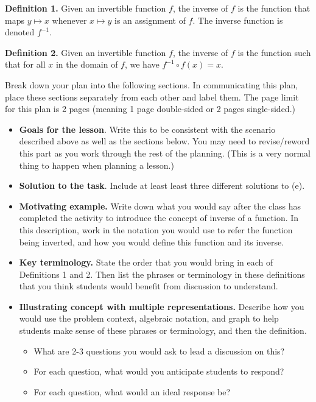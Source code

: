 \documentclass[11pt]{article}
\theoremstyle{definition}
\begin{document}
	\begin{mdframed}
	{\bf Definition 1.}  Given an invertible function $f$, the inverse of $f$ is the function that maps $y\mapsto x$ whenever $x \mapsto y$ is an assignment of $f$. The inverse function is denoted $f^{-1}$.
	
	{\bf Definition 2.} Given an invertible function $f$, the inverse of $f$ is the function such that for all $x$ in the domain of $f$, we have $f^{-1}\circ f(x)=x$.
	\end{mdframed}

Break down your plan into the following sections. In communicating this plan, place these sections separately from each other and label them. The page limit for this plan is 2 pages (meaning 1 page double-sided or 2 pages single-sided.)

	\begin{itemize}
	\item {\bf Goals for the lesson}. Write this to be consistent with the scenario described above as well as the sections below. You may need to revise/reword this part as you work through the rest of the planning. (This is a very normal thing to happen when planning a lesson.)
	\item {\bf Solution to the task}. Include at least least three different solutions to (e). 
	\item {\bf Motivating example.}  Write down what you would say after the class has completed the activity to introduce the concept of inverse of a function. In this description, work in the notation you would use to refer the function being inverted, and how you would define this function and its inverse.
	\item {\bf Key terminology.} State the order that you would bring in each of Definitions 1 and 2. Then list the phrases or terminology in these definitions that you think students would benefit from discussion to understand.
	\item {\bf Illustrating concept with multiple representations.} Describe how you would use the problem context, algebraic notation, and graph to help students make sense of these phrases or terminology, and then the definition.
		\begin{itemize}
		\item What are 2-3 questions you would ask to lead a discussion on this?
		\item For each question, what would you anticipate students to respond?
		\item For each question, what would an ideal response be?

\end{itemize}
\end{itemize}
\end{document}
